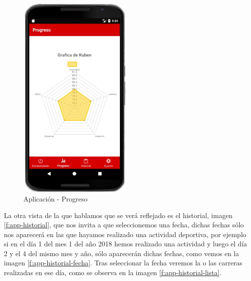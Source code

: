 \documentclass[a4paper, 11pt]{article}
\begin{document}
\begin{itemize}
                \begin{figure}[H]
                 \centering
                 \includegraphics[width=0.5\textwidth]{5progreso}
                 \caption{Aplicación - Progreso}
                 \label{f:app-progreso}
                \end{figure}


      La otra vista de la que hablamos que se verá reflejado es el historial, imagen \ref{f:app-historial}, que nos
      invita a que seleccionemos una fecha, dichas fechas sólo nos aparecerá en las que hayamos realizado  una
      actividad deportiva, por ejemplo si en el día 1 del mes 1 del año 2018 hemos realizado una actividad y
      luego el día 2 y el 4 del mismo mes y año, sólo aparecerán dichas fechas, como vemos en la imagen
      \ref{f:app-historial-fecha}. Tras seleccionar la fecha veremos la o las carreras realizadas en ese día, como
      se observa en la imagen \ref{f:app-historial-lista}.\\




\end{itemize}
\end{document}
